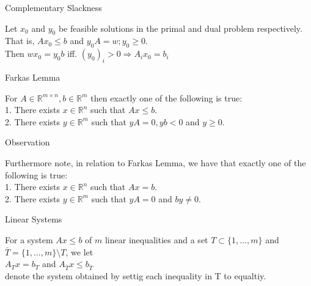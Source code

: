 \documentclass{beamer}
\begin{document}

\begin{frame}  %

	\begin{block}{Complementary Slackness}

		Let $x_0$ and $y_0$ be feasible solutions in the primal and dual problem respectively.
		That is, $Ax_0 \leq b$ and $y_0 A = w; y_0 \geq 0$. \\
		Then $w x_0 = y_0 b$ iff. $(y_0)_i > 0  \Rightarrow A_i x_0 = b_i$

	\end{block}	

	\begin{block}{Farkas Lemma}

		For $A \in \mathbb{R}^{m \times n}, b \in \mathbb{R}^{m}$ then exactly one of the following is true: \\
		1. There exists $x \in \mathbb{R}^n$ such that $Ax \leq b$. \\
		2. There exists $y \in \mathbb{R}^m$ such that $yA=0, yb<0$ and $y \geq 0$. 

	\end{block}

	\begin{block}{Observation}

		Furthermore note, in relation to Farkas Lemma, we have that exactly one of the following is true: \\
		1. There exists $x \in \mathbb{R}^n$ such that $Ax=b$. \\
		2. There exists $y \in \mathbb{R}^m$ such that $yA=0$ and $by \neq 0$.


	\end{block}

\end{frame}


\begin{frame}

	\begin{block}{Linear Systems}

		For a system $Ax \leq b$ of $m$ linear inequalities and a set $T\subset \{1, \dots, m \}$ and $\bar{T} = \{1, \dots, m \} \setminus T$, we let\\ $A_T x = b_T$ and $A_{\bar{T}} x \leq b_{\bar{T}}$ \\denote the system obtained by settig each inequality in T to equaltiy. 

	\end{block}

\end{frame}
\end{document}
